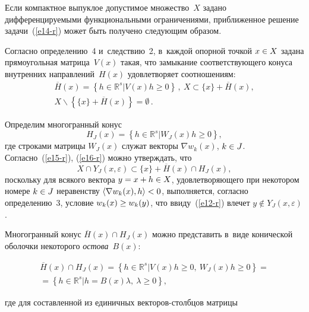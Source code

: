 \begin{multicols}{2}
  Если компактное выпуклое допустимое множество~$X$ задано 
дифференцируемыми функциональными ограничениями, приближенное 
решение задачи~(\ref{e14-r}) может быть получено следующим образом.
  
  Согласно определению~4 и~следствию~2, в~каж\-дой опорной точкой 
$x\hm\in X$ задана прямоугольная мат\-ри\-ца~$V(x)$ такая, что замыкание 
со\-от\-вет\-ст\-ву\-юще\-го конуса внут\-рен\-них на\-прав\-ле\-ний~$H(x)$ удовле\-тво\-ря\-ет 
соотношениям:
  \begin{multline}
  \overline{H}(x)=\left\{ h\in \mathbb{R}^s\vert V(x)h\geq 0\right\}\,,\
  X\subset \{x\} +\overline{H}(x),\\
  X\backslash \left\{ \{x\} +\overline{H}(x)\right\}=\emptyset\,.
  \label{e15-r}
  \end{multline}
  
  Определим многогранный конус
  \begin{equation}
  H_J(x)=\left\{ h\in \mathbb{R}^s\vert W_J(x) h\geq 0\right\},
  \label{e16-r}
  \end{equation}
где строками матрицы $W_J(x)$ служат векторы $\nabla w_k(x)$, $k\hm\in J$. 
Согласно~(\ref{e15-r}), (\ref{e16-r}) мож\-но утверж\-дать, что
\begin{equation}
X\cap Y_J(x,\varepsilon) \subset \{x\} +\overline{H}(x)\cap H_J(x),
\label{e17-r}
\end{equation}
поскольку для всякого вектора $y\hm= x\hm+ h \hm\in X$, удовле\-тво\-ря\-юще\-го 
при некотором номере $k\hm\in J$ неравенству $\langle \nabla w_k(x),h\rangle 
\hm<0$, выполняется, согласно определению~3, условие $w_k(x)\hm\geq 
w_k(y)$, что ввиду~(\ref{e12-r}) влечет $y\not\in Y_J(x,\varepsilon)$.

  Многогранный конус $\overline{H}(x)\cap H_J(x)$ можно представить 
в~виде конической оболочки некоторого \textit{остова}~$B(x)$: 

\vspace*{-6pt}

\noindent
  \begin{multline}
 \! \!\!\overline{H}(x)\cap H_J(x)\!=\!\left\{ h\in \mathbb{R}^s\vert V(x)h\geq 0,\ 
W_J(x)h\geq 0\right\}\!={}\\
  {}= \left\{ h\in \mathbb{R}^s\vert h=B(x)\lambda,\ \lambda\geq0\right\},
  \label{e18-r}
  \end{multline}
  
  \vspace*{-4pt}

\noindent
где для составленной из единичных век\-то\-ров-столб\-цов матрицы 


\end{multicols}
